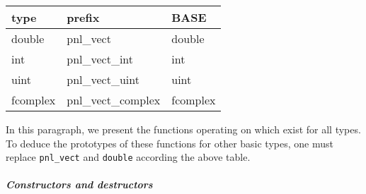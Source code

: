 \begin{center}
  \begin{tabular}[t]{lll}
    type & prefix & BASE\\
    \hline
    double & pnl_vect & double \\
    \hline
    int & pnl_vect_int & int \\
    \hline
    uint & pnl_vect_uint & uint\\
    \hline
    fcomplex & pnl_vect_complex & fcomplex
  \end{tabular}
\end{center}

In this paragraph, we present the functions operating on 
which exist for all types. To deduce the prototypes of these functions for
other basic types, one must replace {\tt pnl_vect} and {\tt double} according
the above table. 
\subparagraph{Constructors and destructors}

